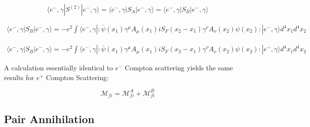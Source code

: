 \documentclass[a4]{article}
\begin{document}
        \begin{framed}

            \begin{equation}
                \langle e^{-}, \gamma | S^{(2)} | e^{-}, \gamma \rangle = \langle e^{-}, \gamma | S_{A} | e^{-}, \gamma \rangle = \langle e^{-}, \gamma | S_{B} | e^{-}, \gamma \rangle
            \end{equation}

            \begin{equation}
                \begin{aligned}
                    \langle e^{-}, \gamma | S_{B} | e^{-}, \gamma \rangle = - e^{2} \int \langle e^{-}, \gamma |:\overline{\psi} (x_1) \gamma^{\mu} A_{\mu} (x_1) i S_{F} (x_2 - x_1) \gamma^{\nu} A_{\nu} (x_2) \psi (x_2):| e^{-}, \gamma \rangle d^{4} x_{1} d^{4} x_{2}
                \end{aligned}
            \end{equation}

            \begin{equation}
                \begin{aligned}
                    \langle e^{-}, \gamma | S_{B} | e^{-}, \gamma \rangle = - e^{2} \int \langle e^{-}, \gamma |:\overline{\psi} (x_1) \gamma^{\mu} A_{\mu} (x_1) i S_{F} (x_2 - x_1) \gamma^{\nu} A_{\nu} (x_2) \psi (x_2):| e^{-}, \gamma \rangle d^{4} x_{1} d^{4} x_{2}
                \end{aligned}
            \end{equation}

            A calculation  essentially identical to $e^{-}$ Compton scattering yields the same results for $e^{+}$ Compton Scattering:

            \begin{equation}
                \mathcal{M}_{fi} = \mathcal{M}_{fi}^{A} + \mathcal{M}_{fi}^{B}
            \end{equation}
        \end{framed}

        \subsection{Pair Annihilation}
\end{document}

